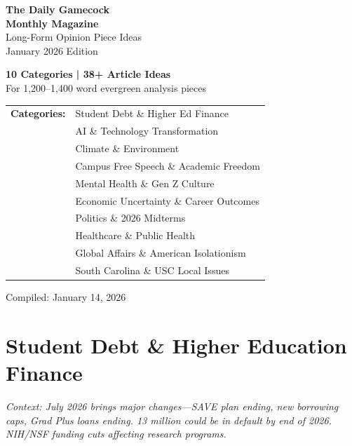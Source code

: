 \documentclass[11pt,letterpaper]{article}
\begin{document}
\begin{titlepage}
    \centering
    \vspace*{2cm}
    {\Huge\bfseries\color{garnet} The Daily Gamecock\\Monthly Magazine\\[0.5cm]}
    {\LARGE Long-Form Opinion Piece Ideas\\[1cm]}
    {\Large January 2026 Edition\\[2cm]}

    \vfill

    {\large\textbf{10 Categories | 38+ Article Ideas}\\[0.5cm]}
    {\normalsize For 1,200--1,400 word evergreen analysis pieces\\[2cm]}

    \begin{tabular}{ll}
    \textbf{Categories:} & Student Debt \& Higher Ed Finance\\
    & AI \& Technology Transformation\\
    & Climate \& Environment\\
    & Campus Free Speech \& Academic Freedom\\
    & Mental Health \& Gen Z Culture\\
    & Economic Uncertainty \& Career Outcomes\\
    & Politics \& 2026 Midterms\\
    & Healthcare \& Public Health\\
    & Global Affairs \& American Isolationism\\
    & South Carolina \& USC Local Issues\\
    \end{tabular}

    \vfill

    {\small Compiled: January 14, 2026}
\end{titlepage}

\tableofcontents
\newpage

\section{Student Debt \& Higher Education Finance}

\textit{Context: July 2026 brings major changes---SAVE plan ending, new borrowing caps, Grad Plus loans ending. 13 million could be in default by end of 2026. NIH/NSF funding cuts affecting research programs.}
\end{document}
